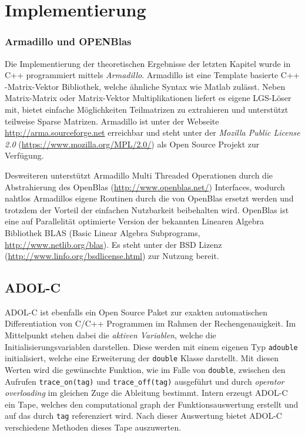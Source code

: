 \chapter{Implementierung}
\subsection{Armadillo und OPENBlas}
Die Implementierung der theoretischen Ergebnisse der letzten Kapitel wurde in C++ programmiert mittels \textit{Armadillo}. 
Armadillo ist eine Template basierte C++ -Matrix-Vektor Bibliothek, welche ähnliche Syntax wie Matlab zulässt. Neben Matrix-Matrix oder Matrix-Vektor Multiplikationen liefert es eigene LGS-Löser mit, bietet einfache Möglichkeiten Teilmatrizen zu extrahieren und unterstützt teilweise Sparse Matrizen. Armadillo ist unter der Webseite \url{http://arma.sourceforge.net} erreichbar und steht unter der \textit{Mozilla Public License 2.0} (\url{https://www.mozilla.org/MPL/2.0/}) als Open Source Projekt zur Verfügung.

Desweiteren unterstützt Armadillo Multi Threaded Operationen durch die Abstrahierung des OpenBlas (\url{http://www.openblas.net/}) Interfaces, wodurch nahtlos Armadillos eigene Routinen durch die von OpenBlas ersetzt werden und trotzdem der Vorteil der einfachen Nutzbarkeit beibehalten wird. OpenBlas ist eine auf Parallelität optimierte Version der bekannten Linearen Algebra Bibliothek BLAS (Basic Linear Algebra Subprograms, \url{http://www.netlib.org/blas}). Es steht unter der BSD Lizenz (\url{http://www.linfo.org/bsdlicense.html}) zur Nutzung bereit.

\section{ADOL-C}
ADOL-C ist ebenfalls ein Open Source Paket zur exakten automatischen Differentiation von C/C++ Programmen im Rahmen der Rechengenauigkeit. Im Mittelpunkt stehen dabei die \textit{aktiven Variablen}, welche die Initialisierungsvariablen darstellen. Diese werden mit einem eigenen Typ \texttt{adouble} initialisiert, welche eine Erweiterung der \texttt{double} Klasse darstellt. Mit diesen Werten wird die gewünschte Funktion, wie im Falle von \texttt{double}, zwischen den Aufrufen \texttt{trace\_on(tag)} und \texttt{trace\_off(tag)} ausgeführt und durch \textit{operator overloading} im gleichen Zuge die Ableitung bestimmt. Intern erzeugt ADOL-C ein Tape, welches den computational graph der Funktionsauswertung erstellt und auf das durch \texttt{tag} referenziert wird. Nach dieser Auswertung bietet ADOL-C verschiedene Methoden dieses Tape auszuwerten.

